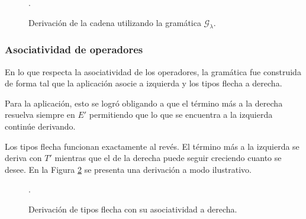\documentclass[11pt]{article}
\begin{document}
\begin{figure}[H] \centering
{}.
\caption{Derivación de la cadena utilizando la gramática $\mathcal{G}_{\lambda}$.}
\label{fig:derivacion_precedencia}
\end{figure}

\subsubsection{Asociatividad de operadores}

En lo que respecta la asociatividad de los operadores, la gramática fue
construida de forma tal que la aplicación asocie a izquierda y los tipos flecha
a derecha.

Para la aplicación, esto se logró obligando a que el término más a la derecha
resuelva siempre en $E'$ permitiendo que lo que se encuentra a la izquierda
continúe derivando.

Los tipos flecha funcionan exactamente al revés. El término más a la izquierda
se deriva con $T'$ mientras que el de la derecha puede seguir creciendo cuanto
se desee. En la Figura \ref{fig:derivacion_asociativa_derecha} se presenta una
derivación a modo ilustrativo.

\begin{figure}[H] \centering
{}.
\caption{Derivación de tipos flecha con su asociatividad a derecha.}
\label{fig:derivacion_asociativa_derecha}
\end{figure}
\end{document}
